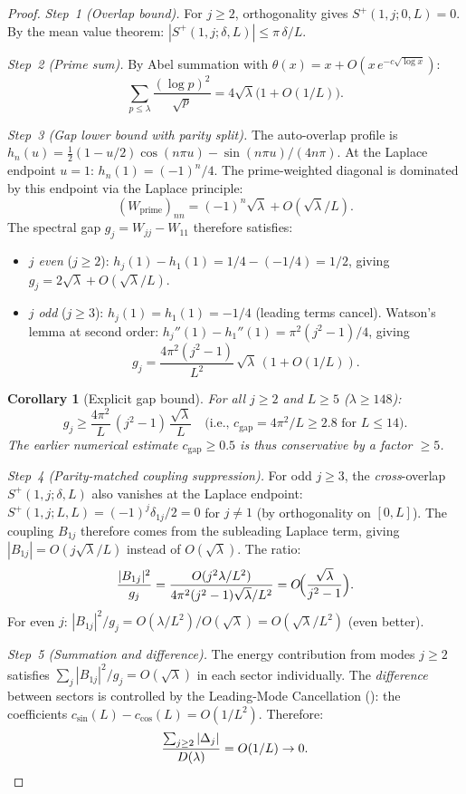 \documentclass[12pt,a4paper]{article}
\newtheorem{corollary}[theorem]{Corollary}
\theoremstyle{definition}
\theoremstyle{remark}
\begin{document}
\begin{proof}
\emph{Step~1 (Overlap bound).} For $j \geq 2$, orthogonality gives $S^+(1,j;0,L) = 0$. By the mean value theorem: $|S^+(1,j;\delta,L)| \leq \pi\,\delta/L$.

\emph{Step~2 (Prime sum).} By Abel summation with $\theta(x) = x + O(x\,e^{-c\sqrt{\log x}})$:
\[
  \sum_{p \leq \lambda}\frac{(\log p)^2}{\sqrt{p}} = 4\sqrt{\lambda}\bigl(1 + O(1/L)\bigr).
\]

\emph{Step~3 (Gap lower bound with parity split).} The auto-overlap profile is $h_n(u) = \tfrac{1}{2}(1-u/2)\cos(n\pi u) - \sin(n\pi u)/(4n\pi)$. At the Laplace endpoint $u = 1$: $h_n(1) = (-1)^n/4$. The prime-weighted diagonal is dominated by this endpoint via the Laplace principle:
\[
  (W_{\mathrm{prime}})_{nn} = (-1)^n\sqrt{\lambda} + O(\sqrt{\lambda}/L).
\]
The spectral gap $g_j = W_{jj} - W_{11}$ therefore satisfies:
\begin{itemize}
  \item \emph{$j$ even} ($j \geq 2$): $h_j(1) - h_1(1) = 1/4 - (-1/4) = 1/2$, giving $g_j = 2\sqrt{\lambda} + O(\sqrt{\lambda}/L)$.
  \item \emph{$j$ odd} ($j \geq 3$): $h_j(1) = h_1(1) = -1/4$ (leading terms cancel). Watson's lemma at second order: $h_j''(1) - h_1''(1) = \pi^2(j^2-1)/4$, giving
  \begin{equation}
  \label{eq:gap-odd}
    g_j = \frac{4\pi^2(j^2-1)}{L^2}\,\sqrt{\lambda}\,(1 + O(1/L)).
  \end{equation}
\end{itemize}

\begin{corollary}[Explicit gap bound]
\label{cor:explicit-gap}
For all $j \geq 2$ and $L \geq 5$ ($\lambda \geq 148$):
\[
  g_j \geq \frac{4\pi^2}{L}\,(j^2 - 1)\,\frac{\sqrt{\lambda}}{L}
  \quad\text{(i.e., } c_{\mathrm{gap}} = 4\pi^2/L \geq 2.8 \text{ for } L \leq 14\text{)}.
\]
The earlier numerical estimate $c_{\mathrm{gap}} \geq 0.5$ is thus conservative by a factor $\geq 5$.
\end{corollary}

\emph{Step~4 (Parity-matched coupling suppression).} For odd $j \geq 3$, the \emph{cross}-overlap $S^+(1,j;\delta,L)$ also vanishes at the Laplace endpoint: $S^+(1,j;L,L) = (-1)^j\delta_{1j}/2 = 0$ for $j \neq 1$ (by orthogonality on $[0,L]$). The coupling $B_{1j}$ therefore comes from the subleading Laplace term, giving $|B_{1j}| = O(j\sqrt{\lambda}/L)$ instead of $O(\sqrt{\lambda})$. The ratio:
\[
  \frac{|B_{1j}|^2}{g_j} = \frac{O(j^2\lambda/L^2)}{4\pi^2(j^2-1)\sqrt{\lambda}/L^2} = O\!\Bigl(\frac{\sqrt{\lambda}}{j^2-1}\Bigr).
\]
For even $j$: $|B_{1j}|^2/g_j = O(\lambda/L^2)/O(\sqrt{\lambda}) = O(\sqrt{\lambda}/L^2)$ (even better).

\emph{Step~5 (Summation and difference).} The energy contribution from modes $j \geq 2$ satisfies $\sum_j |B_{1j}|^2/g_j = O(\sqrt{\lambda})$ in each sector individually. The \emph{difference} between sectors is controlled by the Leading-Mode Cancellation (): the coefficients $c_{\sin}(L) - c_{\cos}(L) = O(1/L^2)$. Therefore:
\[
  \frac{\sum_{j \geq 2}|\Delta_j|}{D(\lambda)} = O(1/L) \to 0. \qedhere
\]
\end{proof}
\end{document}

